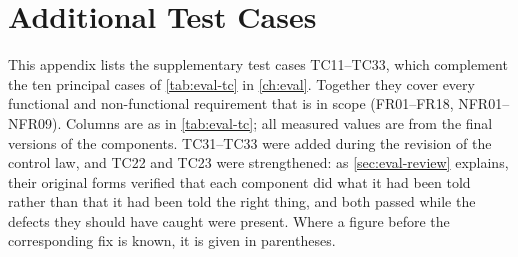 \chapter{Additional Test Cases}\label{app:tests}

This appendix lists the supplementary test cases TC11--TC33, which complement the ten principal cases of \cref{tab:eval-tc} in \cref{ch:eval}. Together they cover every functional and non-functional requirement that is in scope (FR01--FR18, NFR01--NFR09). Columns are as in \cref{tab:eval-tc}; all measured values are from the final versions of the components. TC31--TC33 were added during the revision of the control law, and TC22 and TC23 were strengthened: as \cref{sec:eval-review} explains, their original forms verified that each component did what it had been told rather than that it had been told the right thing, and both passed while the defects they should have caught were present. Where a figure before the corresponding fix is known, it is given in parentheses.

